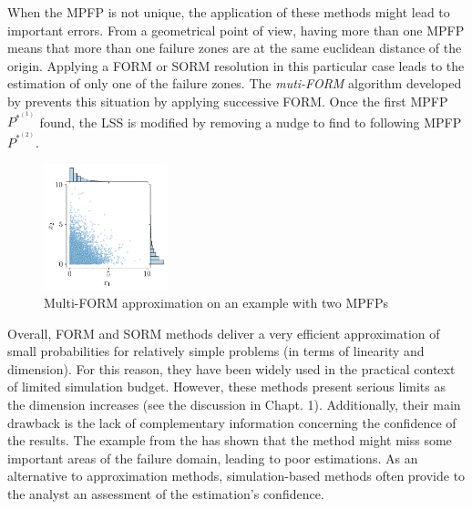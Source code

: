 When the MPFP is not unique, the application of these methods might lead to important errors.
From a geometrical point of view, having more than one MPFP means that more than one failure zones are at the same euclidean distance of the origin.
Applying a FORM or SORM resolution in this particular case leads to the estimation of only one of the failure zones.
The \textit{muti-FORM} algorithm developed by  prevents this situation by applying successive FORM. 
Once the first MPFP $P^{*^{(1)}}$ found, the LSS is modified by removing a nudge to find to following MPFP $P^{*^{(2)}}$. 

\begin{figure}[ht]
    \centering
    \includegraphics[width=0.32\textwidth, draft]{../numerical_experiments/chapter1/figures/independent_copula.png}
    \caption{Multi-FORM approximation on an example with two MPFPs}
    \label{fig:multi_FORM}
\end{figure}


Overall, FORM and SORM methods deliver a very efficient approximation of small probabilities for relatively simple problems (in terms of linearity and dimension). 
For this reason, they have been widely used in the practical context of limited simulation budget. 
However, these methods present serious limits as the dimension increases (see the discussion in  Chapt. 1). 
Additionally, their main drawback is the lack of complementary information concerning the confidence of the results. 
The example from the  has shown that the method might miss some important areas of the failure domain, leading to poor estimations. 
As an alternative to approximation methods, simulation-based methods often provide to the analyst an assessment of the estimation's confidence. 



